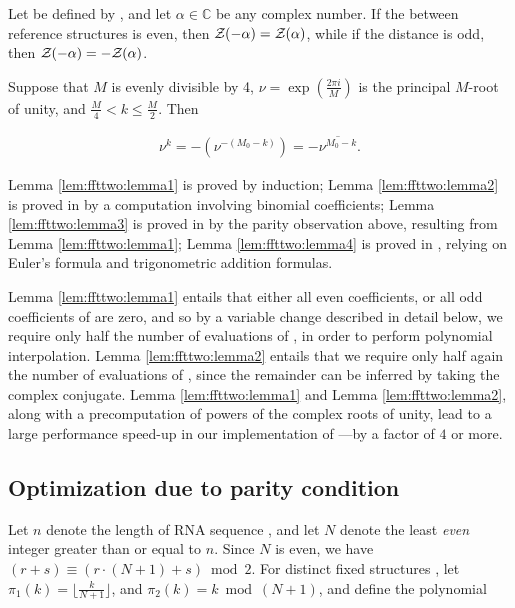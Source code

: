 \begin{lemma}
\label{lem:ffttwo:lemma3}
Let \fullZx be defined by , and
let $\alpha \in \mathbb{C}$ be any complex number.
If the \bpd between reference
structures \strAB is even, then ${\mathcal Z}_{}(-\alpha) = {\mathcal Z}_{}(\alpha)$,
while if
the distance is odd, then ${\mathcal Z}_{}(-\alpha) = -{\mathcal Z}_{}(\alpha)$.
\end{lemma}

\begin{lemma}
\label{lem:ffttwo:lemma4}
Suppose that $M$ is evenly divisible by 4,
$\nu = \exp(\frac{2 \pi i}{M})$ is the principal $M$-root of unity, and
$\frac{M}{4} < k \leq \frac{M}{2}$. Then

\begin{align}
\nu^k = -(\nu^{-(M_0-k)}) = -\overline{\nu^{M_0-k}}.
\end{align}
\end{lemma}

Lemma \ref{lem:ffttwo:lemma1} is proved by induction;
Lemma \ref{lem:ffttwo:lemma2}
is proved in  by a computation involving
binomial coefficients;
Lemma \ref{lem:ffttwo:lemma3} is proved in 
by the parity observation above, resulting from Lemma \ref{lem:ffttwo:lemma1};
Lemma \ref{lem:ffttwo:lemma4} is proved in ,
relying on Euler's formula and trigonometric addition formulas.

Lemma \ref{lem:ffttwo:lemma1}
entails that either all even coefficients, or all odd coefficients
of \fullZx are zero, and so by a variable change described in detail below,
we require only half the number of evaluations of \fullZx, in order to perform
polynomial interpolation.
Lemma \ref{lem:ffttwo:lemma2}
entails that we require only half again the number of evaluations of
\fullZx, since the remainder can be inferred by taking the complex conjugate.
Lemma \ref{lem:ffttwo:lemma1} and Lemma \ref{lem:ffttwo:lemma2},
along with a
precomputation of powers of the complex roots of unity, lead to a
large performance speed-up in our implementation of \ffttwo---by a factor
of $4$ or more.

\subsection{Optimization due to parity condition}
\label{subsec:ffttwo:parity}

Let $n$ denote the length of RNA sequence \seq, and let $N$ denote the
least {\em even} integer greater than or equal to $n$. Since $N$ is even,
we have $(r+s) \equiv (r\cdot(N+1)+s) \bmod 2$. For distinct
fixed structures \strAB, let
$\pi_1(k) = \lfloor \frac{k}{N+1} \rfloor$, and
$\pi_2(k) = k \bmod (N+1)$, and define the polynomial

